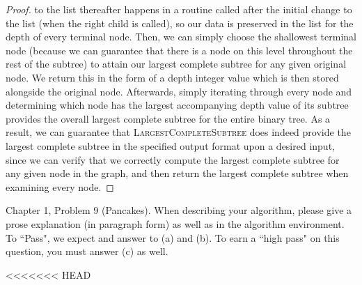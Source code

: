 \documentclass{article}
\begin{document}
\begin{enumerate}
\begin{proof}
		to the list thereafter happens in a routine called after the initial change to the list 
		(when the right child is called), so our data is preserved in the list for the depth of every
		terminal node. Then, we can simply choose the shallowest terminal node (because we can guarantee
		that there is a node on this level throughout the rest of the subtree) to attain our largest
		complete subtree for any given original node. We return this in the form of a depth integer
		value which is then stored alongside the original node. Afterwards, simply iterating through
		every node and determining which node has the largest accompanying depth value of its subtree
		provides the overall largest complete subtree for the entire binary tree. As a result, we can
		guarantee that \textsc{LargestCompleteSubtree} does indeed provide the largest complete subtree
		in the specified output format upon a desired input, since we can verify that we correctly compute
		the largest complete subtree for any given node in the graph, and then return the largest complete
		subtree when examining every node.
	\end{proof}


\end{enumerate}


\nextprob
{}

Chapter 1, Problem 9 (Pancakes). When describing your algorithm, please give a
prose explanation (in paragraph form) as well as in the algorithm environment.
To ``Pass", we expect and answer to (a) and (b).  To earn a ``high pass" on this
question, you must answer (c) as well.

<<<<<<< HEAD
\end{document}
